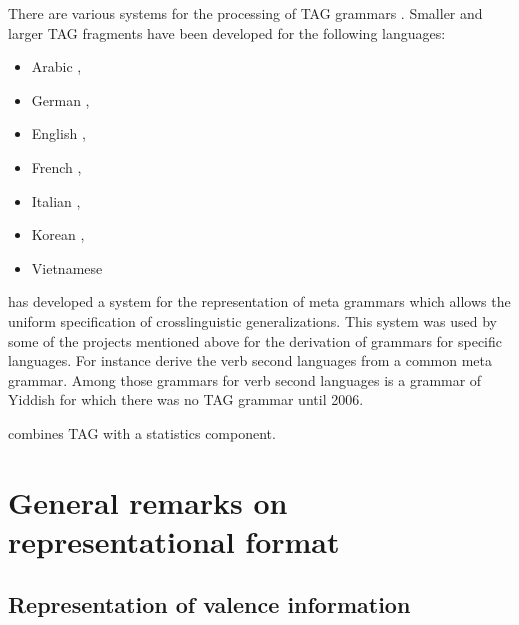 There are various systems for the processing of TAG grammars \citep*{DHSSX2000a-u,PKMLD2008a-u,KLMPDE2008a-u,Koller2017a-u}.
Smaller and larger TAG fragments have been developed for the following languages:
\begin{itemize}
\item Arabic \citep*{ArabTAG2008a},
\item German \citep{Rambow94a,Gerdes2002a,KY2004b,Lichte2007a},
\item English \citep{XTAG2001a,FrankR2002a-u,KrochJoshi87a-u},
\item French \citep{Abeille88a,Candito96a,Candito98a,Candito99a-u,Crabbe2005a-u},
\item Italian \citep{Candito98a,Candito99a-u},%
\item Korean \citep*{HYKP2000a-u,KY2004b},
\item Vietnamese \citep*{VietnameseTAG2008a}
\end{itemize}
\citet{Candito96a} has developed a system for the representation of meta grammars which allows the
uniform specification of crosslinguistic generalizations. This system was used by some of the
projects mentioned above for the derivation of grammars for specific languages. For instance
\citet*{KSYJ2006a} derive the verb second languages from a common meta grammar. Among those grammars for verb second
languages is a grammar of Yiddish for which there was no TAG grammar until 2006.

\citet{Resnik92a} combines TAG with a statistics component.


\section{General remarks on representational format}
\label{sec-tag-allgemein}

\subsection{Representation of valence information}

